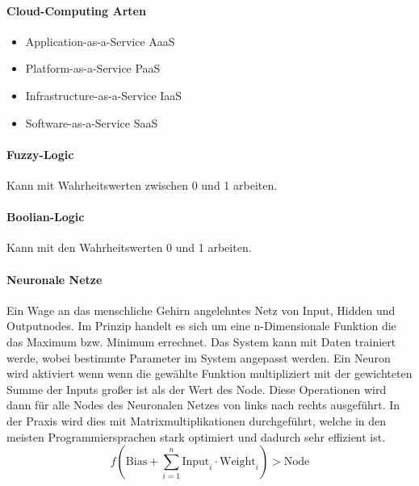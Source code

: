 \documentclass[twocolumn]{article}
\begin{document}
\paragraph{Cloud-Computing Arten}
	\begin{itemize}
		\item Application-as-a-Service AaaS
		\item Platform-as-a-Service PaaS
		\item Infrastructure-as-a-Service IaaS
		\item Software-as-a-Service SaaS
	\end{itemize}

\paragraph{Fuzzy-Logic}
	Kann mit Wahrheitswerten zwischen 0 und 1 arbeiten.

\paragraph{Boolian-Logic}
	Kann mit den Wahrheitswerten 0 und 1 arbeiten.

\paragraph{Neuronale Netze}
Ein Wage an das menschliche Gehirn angelehntes Netz von Input, Hidden und Outputnodes. Im Prinzip handelt es sich um eine n-Dimensionale Funktion die das Maximum bzw. Minimum errechnet. Das System kann mit Daten trainiert werde, wobei bestimmte Parameter im System angepasst werden. Ein Neuron wird aktiviert wenn wenn die gewählte Funktion multipliziert mit der gewichteten Summe der Inputs großer ist als der Wert des Node. Diese Operationen wird dann für alle Nodes des Neuronalen Netzes von links nach rechts ausgeführt. In der Praxis wird dies mit Matrixmultiplikationen durchgeführt, welche in den meisten Programmiersprachen stark optimiert und dadurch sehr effizient ist.
\begin{equation*}
f \left(\text{Bias} + \sum_{i=1}^{n} \text{Input}_i \cdot \text{Weight}_i \right) > \text{Node}
	\end{equation*}
	
\end{document}
